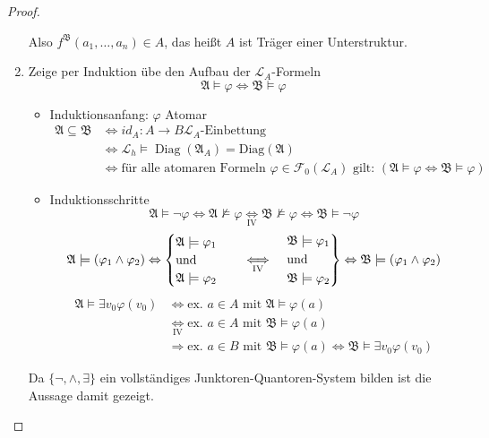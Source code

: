 \documentclass[12pt,parskip=full]{scrartcl}
\theoremstyle{definition}
\begin{document}
\begin{proof}
\begin{enumerate}
			Also $f^\mathfrak{B}(a_1, \dots, a_n) \in A$, das heißt $A$ ist Träger einer Unterstruktur.
			\item Zeige per Induktion übe den Aufbau der $\mathcal{L}_A$-Formeln
			\begin{equation*}
				\mathfrak{A} \models \varphi \Leftrightarrow \mathfrak{B} \models \varphi
			\end{equation*}
			\begin{itemize}
				\item Induktionsanfang: $\varphi$ Atomar
				\begin{align*}
					\mathfrak{A} \subseteq \mathfrak{B} &\Leftrightarrow id_A: A \to B \text{$\mathcal{L}_A$-Einbettung} \\
					&\Leftrightarrow \mathcal{L}_h \models \operatorname{Diag}(\mathfrak{A}_A) = \operatorname{Diag(\mathfrak{A})} \\
					&\Leftrightarrow \text{für alle atomaren Formeln $\varphi \in \mathcal{F}_0(\mathcal{L}_A)$ gilt: } (\mathfrak{A} \models \varphi \Leftrightarrow \mathfrak{B} \models \varphi)
				\end{align*}
				\item Induktionsschritte
				\begin{equation*}
					\mathfrak{A} \models \lnot \varphi \Leftrightarrow \mathfrak{A} \not\models \varphi \underset{\text{IV}}{\Leftrightarrow} \mathfrak{B} \not\models \varphi \Leftrightarrow \mathfrak{B} \models \lnot \varphi
				\end{equation*}
				\begin{equation*}
					\mathfrak{A} \models (\varphi_1 \land \varphi_2) \Leftrightarrow \begin{cases}
						\mathfrak{A} \models \varphi_1 \\
						\text{und} \\
						\mathfrak{A} \models \varphi_2
					\end{cases} \quad\underset{\text{IV}}{\Longleftrightarrow}\quad \begin{drcases}
						\mathfrak{B} \models \varphi_1 \\
						\text{und} \\
						\mathfrak{B} \models \varphi_2
					\end{drcases} \Leftrightarrow \mathfrak{B} \models (\varphi_1 \land \varphi_2)
				\end{equation*}
				\begin{align*}
					\mathfrak{A} \models \exists v_0 \varphi(v_0) &\Leftrightarrow \text{ex. $a \in A$ mit } \mathfrak{A} \models \varphi(a) \\
					&\underset{\text{IV}}{\Leftrightarrow} \text{ex. $a \in A$ mit } \mathfrak{B} \models \varphi(a) \\&\Rightarrow \text{ex. $a \in B$ mit } \mathfrak{B} \models \varphi(a) \Leftrightarrow \mathfrak{B} \models \exists v_0 \varphi(v_0)
				\end{align*}
			\end{itemize}
			Da $\{ \lnot, \land, \exists \}$ ein vollständiges Junktoren-Quantoren-System bilden ist die Aussage damit gezeigt.
		\end{enumerate}
	\end{proof}
\end{document}
